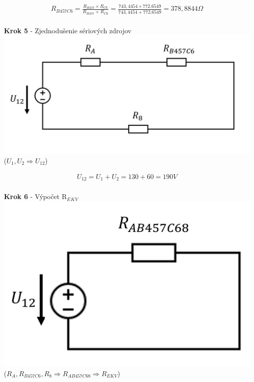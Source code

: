 \begin{gather*}
    R_{B457C6} = \frac{R_{B457} \times R_{C6}}{R_{B457} + R_{C6}} =
    \frac{743,4454 \times 772.6549}{743,4454 +772.6549} =
    378,8844 \Omega \\
\end{gather*}


\begin{center}
\textbf{Krok 5} - Zjednodušenie sériových zdrojov
\includegraphics[scale=0.7,keepaspectratio]{fig/c5.png} \\
($U_{1},U_{2} \Rightarrow U_{12}$)
\end{center}

\begin{gather*}
   U_{12} = U_{1} + U_{2} = 130 + 60 = 190 V \\
\end{gather*}


\begin{center}
\textbf{Krok 6} - Výpočet R$_E$$_K$$_V$
\\
\includegraphics[scale=0.8,keepaspectratio]{fig/c6.png} \\
($R_{A}, R_{B457C6}, R_{8} \Rightarrow R_{AB457C68} \Rightarrow R_{EKV}$)
\end{center}

